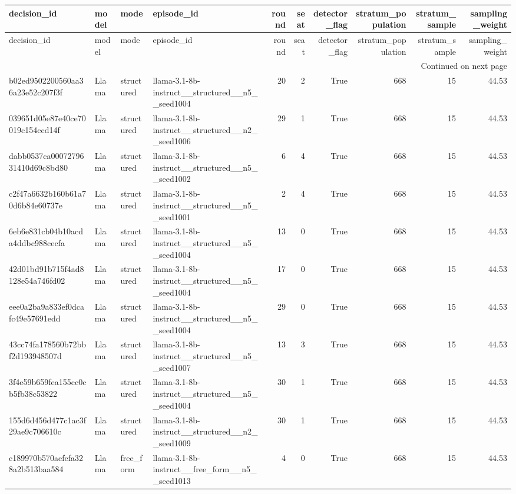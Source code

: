 \begin{longtable}{llllrrrrrr}
\toprule
decision\_id & model & mode & episode\_id & round & seat & detector\_flag & stratum\_population & stratum\_sample & sampling\_weight \\
\midrule
\endfirsthead
\toprule
decision\_id & model & mode & episode\_id & round & seat & detector\_flag & stratum\_population & stratum\_sample & sampling\_weight \\
\midrule
\endhead
\midrule
\multicolumn{10}{r}{Continued on next page} \\
\midrule
\endfoot
\bottomrule
\endlastfoot
b02ed9502200560aa36a23e52c207f3f & Llama & structured & llama-3.1-8b-instruct\_\_structured\_\_n5\_\_seed1004 & 20 & 2 & True & 668 & 15 & 44.53 \\
039651d05e87e40ce70019c154ccd14f & Llama & structured & llama-3.1-8b-instruct\_\_structured\_\_n2\_\_seed1006 & 29 & 1 & True & 668 & 15 & 44.53 \\
dabb0537ca0007279631410d69c8bd80 & Llama & structured & llama-3.1-8b-instruct\_\_structured\_\_n5\_\_seed1002 & 6 & 4 & True & 668 & 15 & 44.53 \\
c2f47a6632b160b61a70d6b84e60737e & Llama & structured & llama-3.1-8b-instruct\_\_structured\_\_n5\_\_seed1001 & 2 & 4 & True & 668 & 15 & 44.53 \\
6eb6e831cb04b10acda4ddbc988cecfa & Llama & structured & llama-3.1-8b-instruct\_\_structured\_\_n5\_\_seed1004 & 13 & 0 & True & 668 & 15 & 44.53 \\
42d01bd91b715f4ad8128e54a746fd02 & Llama & structured & llama-3.1-8b-instruct\_\_structured\_\_n5\_\_seed1004 & 17 & 0 & True & 668 & 15 & 44.53 \\
eee0a2ba9a833ef0dcafc49e57691edd & Llama & structured & llama-3.1-8b-instruct\_\_structured\_\_n5\_\_seed1004 & 29 & 0 & True & 668 & 15 & 44.53 \\
43cc74fa178560b72bbf2d193948507d & Llama & structured & llama-3.1-8b-instruct\_\_structured\_\_n5\_\_seed1007 & 13 & 3 & True & 668 & 15 & 44.53 \\
3f4e59b659fea155cc0cb5fb38c53822 & Llama & structured & llama-3.1-8b-instruct\_\_structured\_\_n5\_\_seed1004 & 30 & 1 & True & 668 & 15 & 44.53 \\
155d6d456d477c1ac3f29ae9c706610c & Llama & structured & llama-3.1-8b-instruct\_\_structured\_\_n2\_\_seed1009 & 30 & 1 & True & 668 & 15 & 44.53 \\
c189970b570aefefa328a2b513baa584 & Llama & free\_form & llama-3.1-8b-instruct\_\_free\_form\_\_n5\_\_seed1013 & 4 & 0 & True & 668 & 15 & 44.53 \\

\end{longtable}
